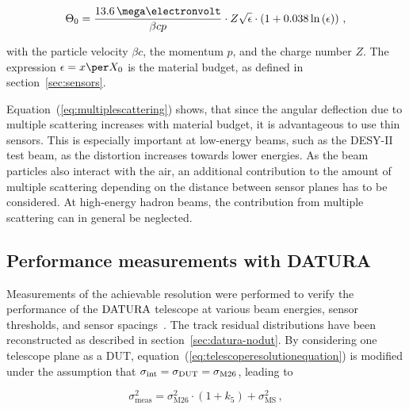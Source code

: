 \begin{equation}
\label{eq:multiplescattering}
\Theta_{0} = \frac{13.6\,\mega\electronvolt}{\beta c p} \cdot Z
\sqrt{\epsilon}
\cdot \left( 1 + 0.038 \ln{\left( \epsilon \right) } \right) \,,
\end{equation}

\noindent with the particle velocity $\beta c$, the momentum $p$, and the charge number $Z$. 
The expression $\epsilon = x \per X_0$ is the material budget, as defined in section~\ref{sec:sensors}.

Equation~(\ref{eq:multiplescattering}) shows, that since the angular deflection due to multiple scattering increases with material budget, it is advantageous to use thin sensors.
This is especially important at low-energy beams, such as the DESY-II test beam, as the distortion increases towards lower energies.
As the beam particles also interact with the air, an additional contribution to the amount of multiple scattering depending on the distance between sensor planes has to be considered. 
At high-energy hadron beams, the contribution from multiple scattering can in general be neglected.

\subsection{Performance measurements with DATURA}
\label{sec:measurements}

Measurements of the achievable resolution were performed to verify the performance of the $\textrm{DATURA}$ telescope at various beam energies, sensor thresholds, and sensor spacings~\cite{ref:thomas}.
The track residual distributions have been reconstructed as described in section~\ref{sec:datura-nodut}.
By considering one telescope plane as a DUT, equation~(\ref{eq:telescoperesolutionequation}) is modified under the assumption that $\sigma_{\textrm{int}} = \sigma_{\textrm{DUT}} = \sigma_{\textrm{M26}}$,
 leading to

\begin{equation}
\label{eq:telescoperesolutionequation_2}
\sigma_{\textrm{meas}}^2 = \sigma_{\textrm{M26}}^2 \cdot \left( 1 + k_5 \right) +
\sigma_{\textrm{MS}}^2\,,
\end{equation}

